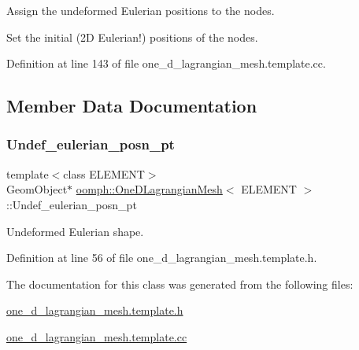 Assign the undeformed Eulerian positions to the nodes. 

Set the initial (2D Eulerian!) positions of the nodes. 

Definition at line 143 of file one\+\_\+d\+\_\+lagrangian\+\_\+mesh.\+template.\+cc.



\subsection{Member Data Documentation}
\mbox{\label{classoomph_1_1OneDLagrangianMesh_af9b27f687d7ec160a01d6ed8c07570ed}} 
\subsubsection{\texorpdfstring{Undef\+\_\+eulerian\+\_\+posn\+\_\+pt}{Undef\_eulerian\_posn\_pt}}
{\footnotesize\ttfamily template$<$class E\+L\+E\+M\+E\+NT$>$ \\
Geom\+Object$\ast$ \hyperlink{classoomph_1_1OneDLagrangianMesh}{oomph\+::\+One\+D\+Lagrangian\+Mesh}$<$ E\+L\+E\+M\+E\+NT $>$\+::Undef\+\_\+eulerian\+\_\+posn\+\_\+pt\hspace{0.3cm}{\ttfamily [private]}}



Undeformed Eulerian shape. 



Definition at line 56 of file one\+\_\+d\+\_\+lagrangian\+\_\+mesh.\+template.\+h.



The documentation for this class was generated from the following files\+:\begin{DoxyCompactItemize}
\item 
\hyperlink{one__d__lagrangian__mesh_8template_8h}{one\+\_\+d\+\_\+lagrangian\+\_\+mesh.\+template.\+h}\item 
\hyperlink{one__d__lagrangian__mesh_8template_8cc}{one\+\_\+d\+\_\+lagrangian\+\_\+mesh.\+template.\+cc}\end{DoxyCompactItemize}
